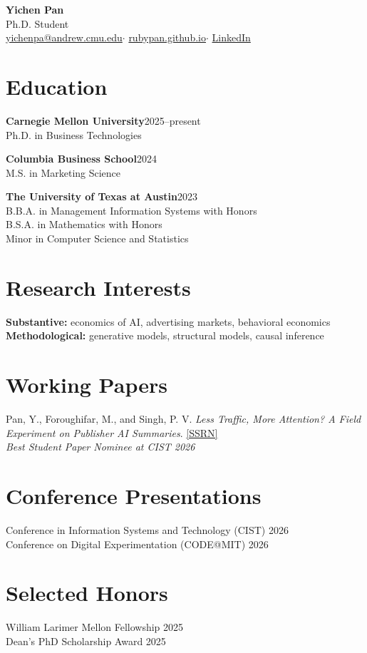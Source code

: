 \documentclass[10.5pt,letterpaper]{article}
\newcommand{\edu}[3]{\noindent\textbf{#1}\hfill #2\\#3\par\vspace{4pt}}
\newcommand{\paper}[2]{\noindent #1\\\textit{#2}\par\vspace{4pt}}
\begin{document}
\begin{center}
{\LARGE\bfseries Yichen Pan}\\[3pt]
Ph.D. Student\\[3pt]
\href{mailto:yichenpa@andrew.cmu.edu}{yichenpa@andrew.cmu.edu}\enspace $\cdot$\enspace
\href{https://rubypan.github.io/}{rubypan.github.io}\enspace $\cdot$\enspace
\href{https://www.linkedin.com/in/ruby-pan}{LinkedIn}
\end{center}
\vspace{1pt}
\section*{Education}
\edu{Carnegie Mellon University}{2025--present}{Ph.D. in Business Technologies}
\edu{Columbia Business School}{2024}{M.S. in Marketing Science}
\edu{The University of Texas at Austin}{2023}{B.B.A. in Management Information Systems with Honors\\
B.S.A. in Mathematics with Honors\\
Minor in Computer Science and Statistics}
\section*{Research Interests}
\textbf{Substantive:} economics of AI, advertising markets, behavioral economics\\[3pt]
\textbf{Methodological:} generative models, structural models, causal inference
\section*{Working Papers}
\paper{Pan, Y., Foroughifar, M., and Singh, P. V. \textit{Less Traffic, More Attention? A Field Experiment on Publisher AI Summaries}. \href{https://papers.ssrn.com/sol3/papers.cfm?abstract_id=7639038}{[SSRN]}}{Best Student Paper Nominee at CIST 2026}
\section*{Conference Presentations}
\noindent Conference in Information Systems and Technology (CIST) \hfill 2026\\[3pt]
Conference on Digital Experimentation (CODE@MIT) \hfill 2026
\section*{Selected Honors}
\noindent William Larimer Mellon Fellowship \hfill 2025\\[3pt]
Dean's PhD Scholarship Award \hfill 2025\\[3pt]
\end{document}
